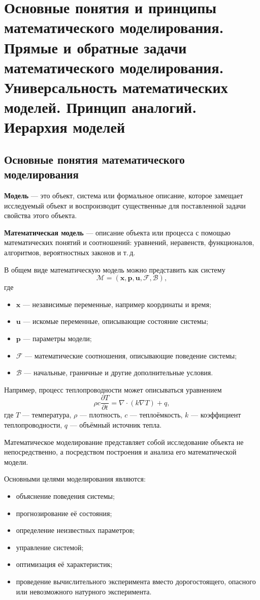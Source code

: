 \section{Основные понятия и принципы математического моделирования. Прямые и обратные задачи математического моделирования. Универсальность математических моделей. Принцип аналогий. Иерархия моделей}

\subsection{Основные понятия математического моделирования}

\textbf{Модель} --- это объект, система или формальное описание, которое
замещает исследуемый объект и воспроизводит существенные для поставленной задачи
свойства этого объекта.

\textbf{Математическая модель} --- описание объекта или процесса с помощью
математических понятий и соотношений: уравнений, неравенств, функционалов,
алгоритмов, вероятностных законов и т.\,д.

В общем виде математическую модель можно представить как систему
\[
\mathcal{M} = (\mathbf{x}, \mathbf{p}, \mathbf{u},
\mathcal{F}, \mathcal{B}),
\]
где
\begin{itemize}
	\item $\mathbf{x}$ --- независимые переменные, например координаты и время;
	\item $\mathbf{u}$ --- искомые переменные, описывающие состояние системы;
	\item $\mathbf{p}$ --- параметры модели;
	\item $\mathcal{F}$ --- математические соотношения, описывающие поведение системы;
	\item $\mathcal{B}$ --- начальные, граничные и другие дополнительные условия.
\end{itemize}

Например, процесс теплопроводности может описываться уравнением
\[
\rho c\frac{\partial T}{\partial t}
=
\nabla\cdot(k\nabla T) + q,
\]
где $T$ --- температура, $\rho$ --- плотность, $c$ --- теплоёмкость,
$k$ --- коэффициент теплопроводности, $q$ --- объёмный источник тепла.

Математическое моделирование представляет собой исследование объекта не
непосредственно, а посредством построения и анализа его математической модели.

Основными целями моделирования являются:
\begin{itemize}
	\item объяснение поведения системы;
	\item прогнозирование её состояния;
	\item определение неизвестных параметров;
	\item управление системой;
	\item оптимизация её характеристик;
	\item проведение вычислительного эксперимента вместо дорогостоящего,
	опасного или невозможного натурного эксперимента.
\end{itemize}

